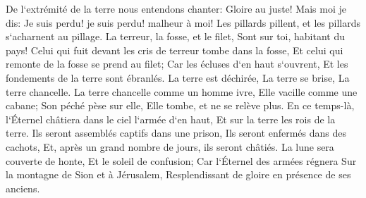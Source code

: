 \verse De l`extrémité de la terre nous entendons chanter: Gloire au juste! Mais moi je dis: Je suis perdu! je suis perdu! malheur à moi! Les pillards pillent, et les pillards s`acharnent au pillage. 
\verse La terreur, la fosse, et le filet, Sont sur toi, habitant du pays! 
\verse Celui qui fuit devant les cris de terreur tombe dans la fosse, Et celui qui remonte de la fosse se prend au filet; Car les écluses d`en haut s`ouvrent, Et les fondements de la terre sont ébranlés. 
\verse La terre est déchirée, La terre se brise, La terre chancelle. 
\verse La terre chancelle comme un homme ivre, Elle vacille comme une cabane; Son péché pèse sur elle, Elle tombe, et ne se relève plus. 
\verse En ce temps-là, l`Éternel châtiera dans le ciel l`armée d`en haut, Et sur la terre les rois de la terre. 
\verse Ils seront assemblés captifs dans une prison, Ils seront enfermés dans des cachots, Et, après un grand nombre de jours, ils seront châtiés. 
\verse La lune sera couverte de honte, Et le soleil de confusion; Car l`Éternel des armées régnera Sur la montagne de Sion et à Jérusalem, Resplendissant de gloire en présence de ses anciens. 


